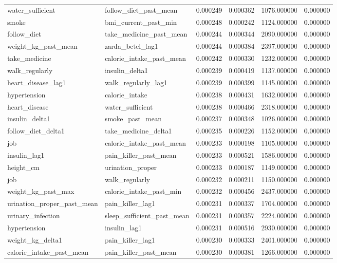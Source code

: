 \begin{longtable}{llrrrr}
water\_sufficient & follow\_diet\_past\_mean & 0.000249 & 0.000362 & 1076.000000 & 0.000000 \\
smoke & bmi\_current\_past\_min & 0.000248 & 0.000242 & 1124.000000 & 0.000000 \\
follow\_diet & take\_medicine\_past\_mean & 0.000244 & 0.000344 & 2090.000000 & 0.000000 \\
weight\_kg\_past\_mean & zarda\_betel\_lag1 & 0.000244 & 0.000384 & 2397.000000 & 0.000000 \\
take\_medicine & calorie\_intake\_past\_mean & 0.000242 & 0.000330 & 1232.000000 & 0.000000 \\
walk\_regularly & insulin\_delta1 & 0.000239 & 0.000419 & 1137.000000 & 0.000000 \\
heart\_disease\_lag1 & walk\_regularly\_lag1 & 0.000239 & 0.000399 & 1145.000000 & 0.000000 \\
hypertension & calorie\_intake & 0.000238 & 0.000431 & 1632.000000 & 0.000000 \\
heart\_disease & water\_sufficient & 0.000238 & 0.000466 & 2318.000000 & 0.000000 \\
insulin\_delta1 & smoke\_past\_mean & 0.000237 & 0.000348 & 1026.000000 & 0.000000 \\
follow\_diet\_delta1 & take\_medicine\_delta1 & 0.000235 & 0.000226 & 1152.000000 & 0.000000 \\
job & calorie\_intake\_past\_mean & 0.000233 & 0.000198 & 1105.000000 & 0.000000 \\
insulin\_lag1 & pain\_killer\_past\_mean & 0.000233 & 0.000521 & 1586.000000 & 0.000000 \\
height\_cm & urination\_proper & 0.000233 & 0.000187 & 1149.000000 & 0.000000 \\
job & walk\_regularly & 0.000232 & 0.000211 & 1150.000000 & 0.000000 \\
weight\_kg\_past\_max & calorie\_intake\_past\_min & 0.000232 & 0.000456 & 2437.000000 & 0.000000 \\
urination\_proper\_past\_mean & pain\_killer\_lag1 & 0.000231 & 0.000337 & 1704.000000 & 0.000000 \\
urinary\_infection & sleep\_sufficient\_past\_mean & 0.000231 & 0.000357 & 2224.000000 & 0.000000 \\
hypertension & insulin\_lag1 & 0.000231 & 0.000516 & 2930.000000 & 0.000000 \\
weight\_kg\_delta1 & pain\_killer\_lag1 & 0.000230 & 0.000333 & 2401.000000 & 0.000000 \\
calorie\_intake\_past\_mean & pain\_killer\_past\_mean & 0.000230 & 0.000381 & 1266.000000 & 0.000000 \\

\end{longtable}
